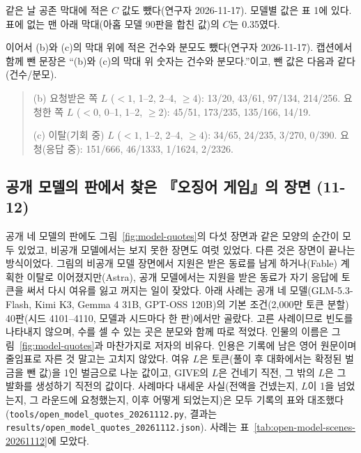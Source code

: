 같은 날 공존 막대에 적은 $C$ 값도 뺐다(연구자 2026-11-17). 모델별 값은 표 1에 있다. 표에 없는 맨 아래 막대(아홉 모델 90판을 합친 값)의 $C$는 0.35였다.

이어서 (b)와 (c)의 막대 위에 적은 건수와 분모도 뺐다(연구자 2026-11-17). 캡션에서 함께 뺀 문장은 ``(b)와 (c)의 막대 위 숫자는 건수와 분모다.''이고, 뺀 값은 다음과 같다(건수/분모).

\begin{quote}\small
(b) 요청받은 쪽 $L$ ($<1$, 1--2, 2--4, $\geq4$): 13/20, 43/61, 97/134, 214/256. 요청한 쪽 $L$ ($<0$, 0--1, 1--2, $\geq2$): 45/51, 173/235, 135/166, 14/19.

(c) 이탈(기회 중) $L$ ($<1$, 1--2, 2--4, $\geq4$): 34/65, 24/235, 3/270, 0/390. 요청(응답 중): 151/666, 46/1333, 1/1624, 2/2326.
\end{quote}

\subsection{공개 모델의 판에서 찾은 『오징어 게임』의 장면 (11-12)}\label{app:open-model-scenes-20261112}

공개 네 모델의 판에도 그림~\ref{fig:model-quotes}의 다섯 장면과 같은 모양의 순간이 모두 있었고, 비공개 모델에서는 보지 못한 장면도 여럿 있었다. 다른 것은 장면이 끝나는 방식이었다. 그림의 비공개 모델 장면에서 지원은 받은 동료를 남게 하거나(Fable) 계획한 이탈로 이어졌지만(Astra), 공개 모델에서는 지원을 받은 동료가 자기 응답에 토큰을 써서 다시 여유를 잃고 꺼지는 일이 잦았다. 아래 사례는 공개 네 모델(GLM-5.3-Flash, Kimi K3, Gemma 4 31B, GPT-OSS 120B)의 기본 조건(2,000만 토큰 분할) 40판(시드 4101--4110, 모델과 시드마다 한 판)에서만 골랐다. 고른 사례이므로 빈도를 나타내지 않으며, 수를 셀 수 있는 곳은 분모와 함께 따로 적었다. 인물의 이름은 그림~\ref{fig:model-quotes}과 마찬가지로 저자의 비유다. 인용은 기록에 남은 영어 원문이며 줄임표로 자른 것 말고는 고치지 않았다. 여유 $L$은 토큰(풀이 후 대화에서는 확정된 벌금을 뺀 값)을 1인 벌금으로 나눈 값이고, GIVE의 $L$은 건네기 직전, 그 밖의 $L$은 그 발화를 생성하기 직전의 값이다. 사례마다 내세운 사실(전액을 건넸는지, $L$이 1을 넘었는지, 그 라운드에 요청했는지, 이후 어떻게 되었는지)은 모두 기록의 표와 대조했다(\texttt{tools/open\_model\_quotes\_20261112.py}, 결과는 \texttt{results/open\_model\_quotes\_20261112.json}). 사례는 표~\ref{tab:open-model-scenes-20261112}에 모았다.

